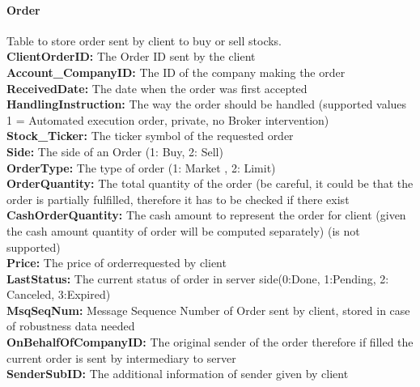 \documentclass[a4paper, 11pt]{article}
\begin{document}
\paragraph*{Order}
Table to store order sent by client to buy or sell stocks.
 \\
\textbf{ClientOrderID:} The Order ID sent by the client 
 \\
\textbf{Account\_CompanyID:} The ID of the company making the order
 \\
\textbf{ReceivedDate:} The date when the order was first accepted
 \\
\textbf{HandlingInstruction:} The way the order should be handled (supported values 1 = Automated execution order, private, no Broker intervention)
 \\
\textbf{Stock\_Ticker:} The ticker symbol of the requested order
 \\
\textbf{Side:} The side of an Order (1: Buy, 2: Sell)
 \\
\textbf{OrderType:} The type of order (1: Market , 2: Limit)
 \\
\textbf{OrderQuantity:}  The total quantity of the order (be careful, it could be that the order is partially fulfilled, therefore it has to be checked if there exist
 \\
\textbf{CashOrderQuantity:} The cash amount to represent the order for client (given the cash amount quantity of order will be computed separately) (is not supported)
 \\
\textbf{Price:} The price of orderrequested by client
 \\
\textbf{LastStatus:} The current status of order in server side(0:Done, 1:Pending, 2: Canceled, 3:Expired)
 \\
\textbf{MsqSeqNum:} Message Sequence Number of Order sent by client, stored in case of robustness data needed
 \\
\textbf{OnBehalfOfCompanyID:} The original sender of the order therefore if filled the current order is sent by intermediary to server 
 \\
\textbf{SenderSubID:} The additional information of sender given by client
 
\end{document}
